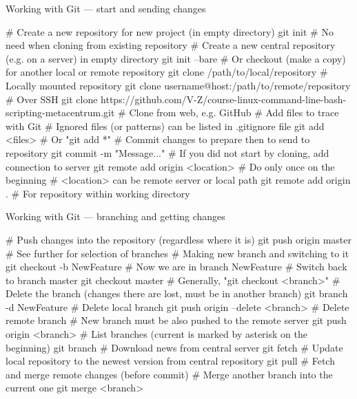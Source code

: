 \documentclass[compress, ucs, xelatex, 11pt, xcolor=svgnames, aspectratio=169,
	hyperref={
		bookmarks=true,
		unicode=true,
		colorlinks=true,
		pdftitle={Linux, command line and MetaCentrum},
		plainpages=false,
		pdfauthor={Vojtech Zeisek},
		pdfsubject={Course about use of Linux command line, writing shell scripts and using MetaCentrum of CESNET},
		pdfcreator={XeLaTeX},
		pdfkeywords={Linux, GNU, BASH, shell, command line, MetaCentrum},
		linkcolor=DarkRed, %
		anchorcolor=DarkBlue, %
		citecolor=Indigo, %
		filecolor=NavyBlue, %
		menucolor=DarkMagenta, %
		urlcolor=DarkBlue, %
		pdftex},
	url={hyphens, lowtilde} %
	]{beamer}
\begin{document}
\begin{frame}[fragile]{Working with Git --- start and sending changes}
	\begin{bashcode}
    # Create a new repository for new project (in empty directory)
    git init # No need when cloning from existing repository
    # Create a new central repository (e.g. on a server) in empty directory
    git init --bare
    # Or checkout (make a copy) for another local or remote repository
    git clone /path/to/local/repository # Locally mounted repository
    git clone username@host:/path/to/remote/repository # Over SSH
    git clone https://github.com/V-Z/course-linux-command-line-bash-
      scripting-metacentrum.git # Clone from web, e.g. GitHub
    # Add files to trace with Git
    # Ignored files (or patterns) can be listed in .gitignore file
    git add <files> # Or "git add *"
    # Commit changes to prepare then to send to repository
    git commit -m "Message..."
    # If you did not start by cloning, add connection to server
    git remote add origin <location> # Do only once on the beginning
    # <location> can be remote server or local path
    git remote add origin . # For repository within working directory
	\end{bashcode}
\end{frame}

\begin{frame}[fragile]{Working with Git --- branching and getting changes}
	\begin{bashcode}
    # Push changes into the repository (regardless where it is)
    git push origin master # See further for selection of branches
    # Making new branch and switching to it
    git checkout -b NewFeature # Now we are in branch NewFeature
    # Switch back to branch master
    git checkout master # Generally, "git checkout <branch>"
    # Delete the branch (changes there are lost, must be in another branch)
    git branch -d NewFeature # Delete local branch
    git push origin --delete <branch> # Delete remote branch
    # New branch must be also pushed to the remote server
    git push origin <branch>
    # List branches (current is marked by asterisk on the beginning)
    git branch
    # Download news from central server
    git fetch
    # Update local repository to the newest version from central repository
    git pull # Fetch and merge remote changes (before commit)
    # Merge another branch into the current one
    git merge <branch>
	\end{bashcode}
\end{frame}
\end{document}
